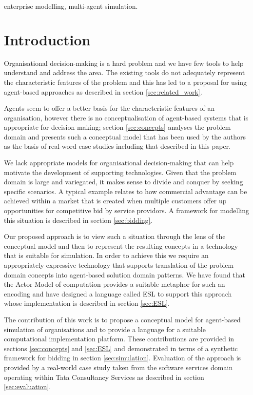 \documentclass[10pt,numbers]{sigplanconf}
\begin{document}

\keywords
enterprise modelling, multi-agent simulation.

\section{Introduction}

Organisational decision-making is a hard problem and we have few tools to help understand and address the area. The existing tools do not adequately represent the characteristic features of the problem and this has led to a proposal for using agent-based approaches as described in section \ref{sec:related_work}. 

Agents seem to offer a better basis for the characteristic features of an organisation, however there is no conceptualisation of agent-based systems that is appropriate for decision-making; section \ref{sec:concepts} analyses the problem domain and presents such a conceptual model that has been used by the authors as the basis of real-word case studies including that described in this paper.

We lack appropriate models for organisational decision-making that can help motivate the development of supporting technologies. Given that the problem domain is large and variegated, it makes sense to divide and conquer by seeking specific scenarios. A typical example relates to how commercial advantage can be achieved within a market that is created when multiple customers offer up opportunities for competitive bid by service providors. A framework for modelling this situation is described in section \ref{sec:bidding}. 

Our proposed approach is to view such a situation through the lens of the conceptual model and then to represent the resulting concepts in a technology that is suitable for simulation. In order to achieve this we require an appropriately expressive technology that supports translation of the problem domain concepts into agent-based solution domain patterns. We have found that the Actor Model of computation provides a suitable metaphor for such an encoding and have designed a language called ESL to support this approach whose  implementation is described in section \ref{sec:ESL}.

The contribution of this work is to propose a conceptual model for agent-based simulation of organisations and to provide a language for a suitable computational implementation platform. These contributions are provided in sections \ref{sec:concepts} and \ref{sec:ESL} and demonstrated in terms of a synthetic framework for bidding in section \ref{sec:simulation}. Evaluation of the approach is provided by a real-world case study taken from the software services domain operating within Tata Consultancy Services as described in section \ref{sec:evaluation}.
\end{document}
